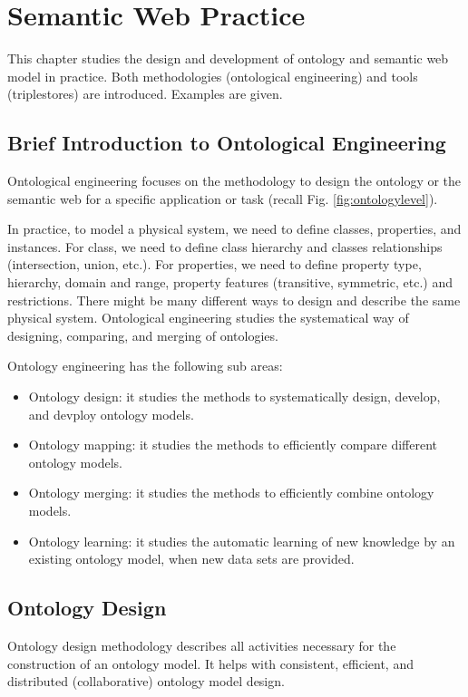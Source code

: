 \chapter{Semantic Web Practice} \label{ch:semanticwebpractice}

This chapter studies the design and development of ontology and semantic web model in practice. Both methodologies (ontological engineering) and tools (triplestores) are introduced. Examples are given.

\section{Brief Introduction to Ontological Engineering}

Ontological engineering focuses on the methodology to design the ontology or the semantic web for a specific application or task (recall Fig. \ref{fig:ontologylevel}).

In practice, to model a physical system, we need to define classes, properties, and instances. For class, we need to define class hierarchy and classes relationships (intersection, union, etc.). For properties, we need to define property type, hierarchy, domain and range, property features (transitive, symmetric, etc.) and restrictions. There might be many different ways to design and describe the same physical system. Ontological engineering studies the systematical way of designing, comparing, and merging of ontologies.

Ontology engineering has the following sub areas:
\begin{itemize}
	\item Ontology design: it studies the methods to systematically design, develop, and devploy ontology models.
	\item Ontology mapping: it studies the methods to efficiently compare different ontology models.
	\item Ontology merging: it studies the methods to efficiently combine ontology models.
	\item Ontology learning: it studies the automatic learning of new knowledge by an existing ontology model, when new data sets are provided.
\end{itemize}

\section{Ontology Design}

Ontology design methodology describes all activities necessary for the construction of an ontology model. It helps with consistent, efficient, and distributed (collaborative) ontology model design.

